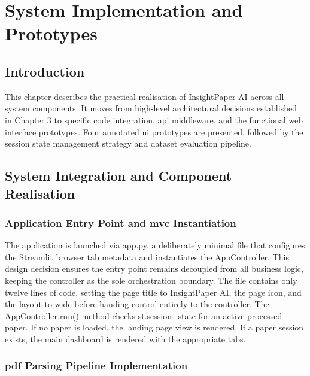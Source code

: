 \chapter{System Implementation and Prototypes}

\section{Introduction}

This chapter describes the practical realisation of InsightPaper AI across all system components. It moves from high-level architectural decisions established in Chapter 3 to specific code integration, \gls{api} middleware, and the functional web interface prototypes. Four annotated \gls{ui} prototypes are presented, followed by the session state management strategy and dataset evaluation pipeline.

\section{System Integration and Component Realisation}

\subsection{Application Entry Point and \gls{mvc} Instantiation}

The application is launched via app.py, a deliberately minimal file that configures the Streamlit browser tab metadata and instantiates the AppController. This design decision ensures the entry point remains decoupled from all business logic, keeping the controller as the sole orchestration boundary. The file contains only twelve lines of code, setting the page title to InsightPaper AI, the page icon, and the layout to wide before handing control entirely to the controller.
\newline \newline The AppController.run() method checks st.session\_state for an active processed paper. If no paper is loaded, the landing page view is rendered. If a paper session exists, the main dashboard is rendered with the appropriate tabs.

\subsection{\gls{pdf} Parsing Pipeline Implementation}

